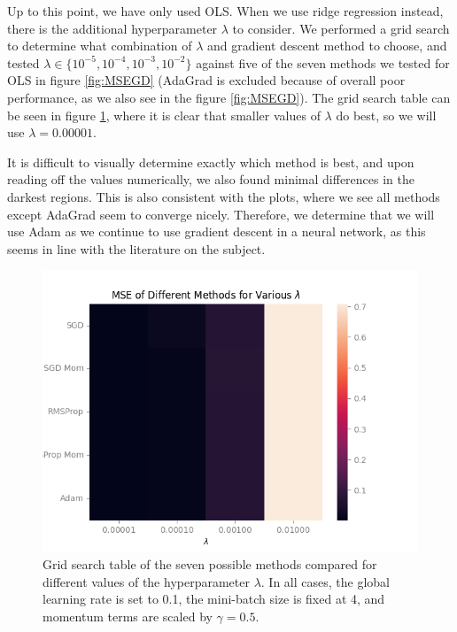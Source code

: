 Up to this point, we have only used OLS. When we use ridge regression instead, there is the additional hyperparameter $\lambda$ to consider. We performed a grid search to determine what combination of $\lambda$ and gradient descent method to choose, and tested $\lambda \in \{10^{-5}, 10^{-4}, 10^{-3}, 10^{-2}\}$ against five of the seven methods we tested for OLS in figure \ref{fig:MSEGD} (AdaGrad is excluded because of overall poor performance, as we also see in the figure \ref{fig:MSEGD}). The grid search table can be seen in figure \ref{fig:gridsearch_ridge}, where it is clear that smaller values of $\lambda$ do best, so we will use $\lambda = 0.00001$.

It is difficult to visually determine exactly which method is best, and upon reading off the values numerically, we also found minimal differences in the darkest regions. This is also consistent with the plots, where we see all methods except AdaGrad seem to converge nicely. Therefore, we determine that we will use Adam as we continue to use gradient descent in a neural network, as this seems in line with the literature on the subject.
\begin{figure}
    \centering
    \includegraphics[width=\linewidth]{figures/all_plots/gridsearch_ridge.png}
    \caption{Grid search table of the seven possible methods compared for different values of the hyperparameter $\lambda$. In all cases, the global learning rate is set to 0.1, the mini-batch size is fixed at 4, and momentum terms are scaled by $\gamma = 0.5$.}
    \label{fig:gridsearch_ridge}
\end{figure}

